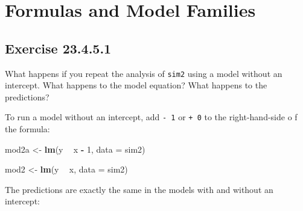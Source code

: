 \documentclass[]{book}
\newenvironment{Shaded}{\begin{snugshade}}{\end{snugshade}}
\newcommand{\CommentTok}[1]{\textcolor[rgb]{0.56,0.35,0.01}{\textit{#1}}}
\newcommand{\DataTypeTok}[1]{\textcolor[rgb]{0.13,0.29,0.53}{#1}}
\newcommand{\DecValTok}[1]{\textcolor[rgb]{0.00,0.00,0.81}{#1}}
\newcommand{\KeywordTok}[1]{\textcolor[rgb]{0.13,0.29,0.53}{\textbf{#1}}}
\newcommand{\NormalTok}[1]{#1}
\newcommand{\OperatorTok}[1]{\textcolor[rgb]{0.81,0.36,0.00}{\textbf{#1}}}
\newcommand{\StringTok}[1]{\textcolor[rgb]{0.31,0.60,0.02}{#1}}
\theoremstyle{plain}
\theoremstyle{remark}
\begin{document}
\hypertarget{formulas-and-model-families}{%
\section{Formulas and Model
Families}\label{formulas-and-model-families}}

\hypertarget{exercise-23.4.5.1}{%
\subsection*{\texorpdfstring{Exercise
{23.4.5.1}}{Exercise 23.4.5.1}}\label{exercise-23.4.5.1}}

What happens if you repeat the analysis of \texttt{sim2} using a model
without an intercept. What happens to the model equation? What happens
to the predictions?

To run a model without an intercept, add \texttt{-\ 1} or \texttt{+\ 0}
to the right-hand-side o f the formula:

\begin{Shaded}
\begin{Highlighting}[]
\NormalTok{mod2a <-}\StringTok{ }\KeywordTok{lm}\NormalTok{(y }\OperatorTok{~}\StringTok{ }\NormalTok{x }\OperatorTok{-}\StringTok{ }\DecValTok{1}\NormalTok{, }\DataTypeTok{data =}\NormalTok{ sim2)}
\end{Highlighting}
\end{Shaded}

\begin{Shaded}
\begin{Highlighting}[]
\NormalTok{mod2 <-}\StringTok{ }\KeywordTok{lm}\NormalTok{(y }\OperatorTok{~}\StringTok{ }\NormalTok{x, }\DataTypeTok{data =}\NormalTok{ sim2)}
\end{Highlighting}
\end{Shaded}

The predictions are exactly the same in the models with and without an
intercept:

\begin{Shaded}
\end{Shaded}
\end{document}
